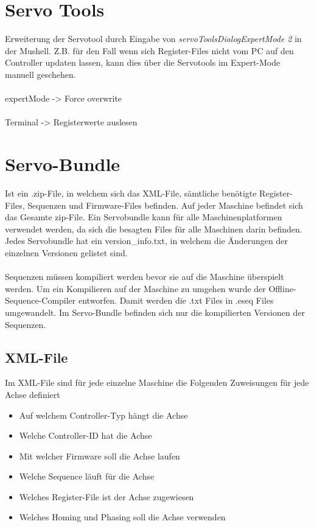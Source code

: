 \section{Servo Tools}
	Erweiterung der Servotool durch Eingabe von \textit{servoToolsDialogExpertMode 2} in der Mushell. Z.B. für den Fall wenn sich Register-Files nicht vom PC auf den Controller updaten lassen, kann dies über die Servotools im Expert-Mode manuell geschehen.\\\\
	
	expertMode -> Force overwrite\\\\
	
	Terminal -> Registerwerte auslesen

\section{Servo-Bundle}
	Ist ein .zip-File, in welchem sich das XML-File, sämtliche benötigte Register-Files, Sequenzen und Firmware-Files befinden. Auf jeder Maschine befindet sich das Gesamte zip-File. Ein Servobundle kann für alle Maschinenplatformen verwendet werden, da sich die besagten Files für alle Maschinen darin befinden. Jedes Servobundle hat ein version\_info.txt, in welchem die Änderungen der einzelnen Versionen gelistet sind.\\\\ Sequenzen müssen kompiliert werden bevor sie auf die Maschine überspielt werden. Um ein Kompilieren auf der Maschine zu umgehen wurde der Offline-Sequence-Compiler entworfen. Damit werden die .txt Files in .eseq Files umgewandelt. Im Servo-Bundle befinden sich nur die kompilierten Versionen der Sequenzen.
	\subsection{XML-File}
		Im XML-File sind für jede einzelne Maschine die Folgenden Zuweisungen für jede Achse definiert
		\begin{itemize}
			\item Auf welchem Controller-Typ hängt die Achse
			\item Welche Controller-ID hat die Achse
			\item Mit welcher Firmware soll die Achse laufen
			\item Welche Sequence läuft für die Achse
			\item Welches Register-File ist der Achse zugewiesen
			\item Welches Homing und Phasing soll die Achse verwenden
		\end{itemize}